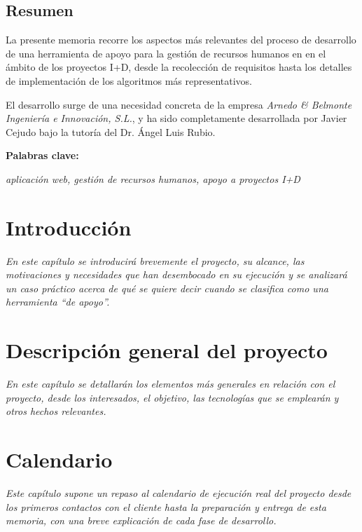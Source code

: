 \documentclass[a4paper,12pt]{book}
\begin{document}


\thispagestyle{empty}
\section*{Resumen}

La presente memoria recorre los aspectos más relevantes del proceso de
desarrollo de una herramienta de apoyo para la gestión de recursos humanos en
en el ámbito de los proyectos I+D, desde la recolección de requisitos hasta
los detalles de implementación de los algoritmos más representativos.

El desarrollo surge de una necesidad concreta de la empresa \textit{Arnedo \&
Belmonte Ingeniería e Innovación, S.L.}, y ha sido completamente desarrollada
por Javier Cejudo bajo la tutoría del Dr. Ángel Luis Rubio.

\quad

\textbf{Palabras clave:}

\textit{aplicación web, gestión de recursos humanos, apoyo a proyectos I+D}

\setcounter{tocdepth}{2}

\tableofcontents

\newpage\listoffigures
\label{ind:figuras}

\newpage\listoftables
\label{ind:cuadros}

\chapter{Introducción}  
\label{chp:introduccion}
\thispagestyle{empty}
\noindent \textit{En este capítulo se introducirá brevemente el proyecto, su
alcance, las motivaciones y necesidades que han desembocado en su ejecución y se
analizará un caso práctico acerca de qué se quiere decir cuando se clasifica
como una herramienta ``de apoyo''.}


\chapter{Descripción general del proyecto}
\label{chp:descripcion}
\thispagestyle{empty}
\noindent \textit{En este capítulo se detallarán los elementos más generales
en relación con el proyecto, desde los interesados, el objetivo, las
tecnologías que se emplearán y otros hechos relevantes.}


\chapter{Calendario}
\label{chp:calendario}
\thispagestyle{empty}
\noindent \textit{Este capítulo supone un repaso al calendario de ejecución
real del proyecto desde los primeros contactos con el cliente hasta la
preparación y entrega de esta memoria, con una breve explicación de cada fase
de desarrollo.}

\end{document}
